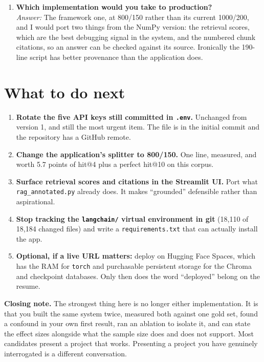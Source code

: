 \documentclass[11pt,a4paper]{article}
\begin{document}
\begin{enumerate}[leftmargin=*,itemsep=6pt]
\item \textbf{Which implementation would you take to production?}\\
\emph{Answer:} The framework one, at 800/150 rather than its current 1000/200, and
I would port two things from the NumPy version: the retrieval scores, which are
the best debugging signal in the system, and the numbered chunk citations, so an
answer can be checked against its source. Ironically the 190-line script has
better provenance than the application does.

\end{enumerate}

\section{What to do next}

\begin{enumerate}[leftmargin=*]
  \item \textbf{Rotate the five API keys still committed in \texttt{.env}.}
        Unchanged from version 1, and still the most urgent item. The file is in
        the initial commit and the repository has a GitHub remote.
  \item \textbf{Change the application's splitter to 800/150.} One line, measured,
        and worth 5.7 points of hit@4 plus a perfect hit@10 on this corpus.
  \item \textbf{Surface retrieval scores and citations in the Streamlit UI.} Port
        what \texttt{rag\_annotated.py} already does. It makes ``grounded''
        defensible rather than aspirational.
  \item \textbf{Stop tracking the \texttt{langchain/} virtual environment in git}
        (18{,}110 of 18{,}184 changed files) and write a
        \texttt{requirements.txt} that can actually install the app.
  \item \textbf{Optional, if a live URL matters:} deploy on Hugging Face Spaces,
        which has the RAM for \texttt{torch} and purchasable persistent storage
        for the Chroma and checkpoint databases. Only then does the word
        ``deployed'' belong on the resume.
\end{enumerate}

\vspace{0.8em}
\noindent
\textbf{Closing note.} The strongest thing here is no longer either
implementation. It is that you built the same system twice, measured both against
one gold set, found a confound in your own first result, ran an ablation to
isolate it, and can state the effect sizes alongside what the sample size does
and does not support. Most candidates present a project that works. Presenting a
project you have genuinely interrogated is a different conversation.
\end{document}
